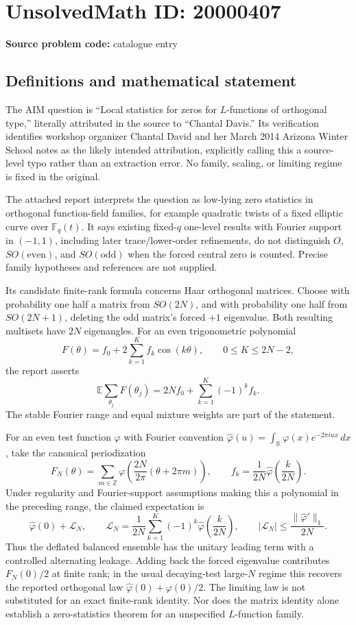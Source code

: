 \documentclass[11pt]{article}
\newcommand{\Z}{\mathbb{Z}}
\newcommand{\R}{\mathbb{R}}
\newcommand{\F}{\mathbb{F}}
\newcommand{\E}{\mathbb{E}}
\begin{document}
\section*{UnsolvedMath ID: 20000407}
\textbf{Source problem code:} catalogue entry
\subsection{Definitions and mathematical statement}
The AIM question is ``Local statistics for zeros for \(L\)-functions of orthogonal type,'' literally attributed in the source to ``Chantal Davis.'' Its verification identifies workshop organizer Chantal David and her March 2014 Arizona Winter School notes as the likely intended attribution, explicitly calling this a source-level typo rather than an extraction error. No family, scaling, or limiting regime is fixed in the original.

The attached report interprets the question as low-lying zero statistics in orthogonal function-field families, for example quadratic twists of a fixed elliptic curve over \(\F_q(t)\). It says existing fixed-\(q\) one-level results with Fourier support in \((-1,1)\), including later trace/lower-order refinements, do not distinguish \(O\), \(SO(\mathrm{even})\), and \(SO(\mathrm{odd})\) when the forced central zero is counted. Precise family hypotheses and references are not supplied.

Its candidate finite-rank formula concerns Haar orthogonal matrices. Choose with probability one half a matrix from \(SO(2N)\), and with probability one half from \(SO(2N+1)\), deleting the odd matrix's forced \(+1\) eigenvalue. Both resulting multisets have \(2N\) eigenangles. For an even trigonometric polynomial
\[
F(\theta)=f_0+2\sum_{k=1}^Kf_k\cos(k\theta),\qquad0\leq K\leq2N-2,
\]
the report asserts
\[
\E\sum_{\theta_j}F(\theta_j)
=2Nf_0+\sum_{k=1}^K(-1)^kf_k.
\]
The stable Fourier range and equal mixture weights are part of the statement.

For an even test function \(\varphi\) with Fourier convention \(\widehat\varphi(u)=\int_{\R}\varphi(x)e^{-2\pi iux}\,dx\), take the canonical periodization
\[
F_N(\theta)=\sum_{m\in\Z}\varphi\!\left(\frac{2N}{2\pi}(\theta+2\pi m)\right),\qquad
f_k=\frac1{2N}\widehat\varphi\!\left(\frac{k}{2N}\right).
\]
Under regularity and Fourier-support assumptions making this a polynomial in the preceding range, the claimed expectation is
\[
\widehat\varphi(0)+\mathcal L_N,\qquad
\mathcal L_N=\frac1{2N}\sum_{k=1}^K(-1)^k\widehat\varphi\!\left(\frac{k}{2N}\right),\qquad
|\mathcal L_N|\leq\frac{\|\widehat\varphi'\|_1}{2N}.
\]
Thus the deflated balanced ensemble has the unitary leading term with a controlled alternating leakage. Adding back the forced eigenvalue contributes \(F_N(0)/2\) at finite rank; in the usual decaying-test large-\(N\) regime this recovers the reported orthogonal law \(\widehat\varphi(0)+\varphi(0)/2\). The limiting law is not substituted for an exact finite-rank identity. Nor does the matrix identity alone establish a zero-statistics theorem for an unspecified \(L\)-function family.
\end{document}
